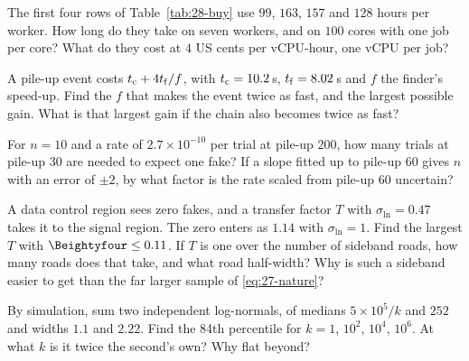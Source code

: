 \begin{exercises}
  \item\label{ex:28-wall} The first four rows of Table~\ref{tab:28-buy} use $99$, $163$, $157$ and $128$ hours per worker. How long do they take on seven workers, and on $100$ cores with one job per core? What do they cost at $4$ US cents per vCPU-hour, one vCPU per job?
  \item\label{ex:28-amdahl} A pile-up event costs $t_{\rm c}+4t_{\rm f}/f$, with $t_{\rm c}=10.2$\,s, $t_{\rm f}=8.02$\,s and $f$ the finder's speed-up. Find the $f$ that makes the event twice as fast, and the largest possible gain. What is that largest gain if the chain also becomes twice as fast?
  \item\label{ex:28-trials} For $n=10$ and a rate of $2.7\times10^{-10}$ per trial at pile-up 200, how many trials at pile-up 30 are needed to expect one fake? If a slope fitted up to pile-up 60 gives $n$ with an error of $\pm2$, by what factor is the rate scaled from pile-up 60 uncertain?
  \item\label{ex:28-control} A data control region sees zero fakes, and a transfer factor $T$ with $\sigma_{\ln}=0.47$ takes it to the signal region. The zero enters as $1.14$ with $\sigma_{\ln}=1$. Find the largest $T$ with $\Beightyfour\le0.11$. If $T$ is one over the number of sideband roads, how many roads does that take, and what road half-width? Why is such a sideband easier to get than the far larger sample of \eqref{eq:27-nature}?
  \item\label{ex:28-floor} By simulation, sum two independent log-normals, of medians $5\times10^5/k$ and $252$ and widths $1.1$ and $2.22$. Find the 84th percentile for $k=1$, $10^2$, $10^4$, $10^6$. At what $k$ is it twice the second's own? Why flat beyond?
\end{exercises}
